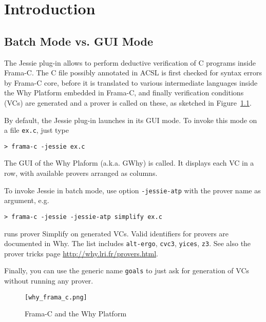 \documentclass[a4paper,11pt,twoside,openright]{report}
\begin{document}
\sloppy
{}


\tableofcontents

\chapter{Introduction}

\section{Batch Mode vs. GUI Mode}

The Jessie plug-in allows to perform deductive verification of C
programs inside Frama-C. The C file possibly annotated in ACSL is
first checked for syntax errors by Frama-C core, before it is
translated to various intermediate languages inside the Why Platform
embedded in Frama-C, and finally verification conditions (VCs) are
generated and a prover is called on these, as sketched in
Figure~\ref{fig:platform}.

By default, the Jessie plug-in launches in its GUI mode. To invoke this
mode on a file \verb|ex.c|, just type

\begin{verbatim}
> frama-c -jessie ex.c
\end{verbatim}

The GUI of the Why Plaform (a.k.a. GWhy) is called. It displays each VC in a row, with available provers arranged as columns.


To invoke Jessie in batch mode, use option \verb|-jessie-atp| with the prover name as argument, e.g.
\begin{verbatim}
> frama-c -jessie -jessie-atp simplify ex.c
\end{verbatim}
runs prover Simplify on generated VCs. Valid identifiers for
provers are documented in Why. The list includes \verb|alt-ergo|,
\verb|cvc3|, \verb|yices|, \verb|z3|. See also the prover tricks page
\url{http://why.lri.fr/provers.html}.

Finally, you can use the generic name \verb|goals| to just ask for
generation of VCs without running any prover.

\begin{figure}[t]
  \begin{center}
  \verb|[why_frama_c.png]|
  \end{center}
  \caption{Frama-C and the Why Platform}
  \label{fig:platform}
\hrulefill
\end{figure}
\end{document}
